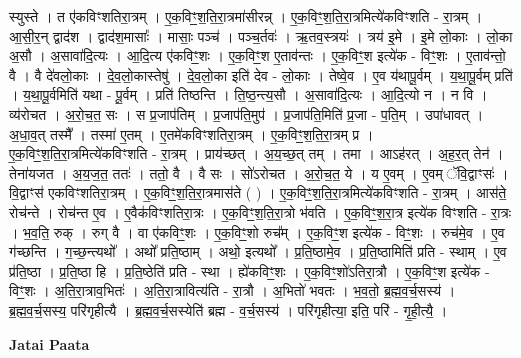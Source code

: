 \documentclass[17pt]{extarticle}
\begin{document}
स्युस्ते । त ए॑कविꣳशतिरा॒त्रम् । ए॒क॒विꣳ॒॒श॒ति॒रा॒त्रमा॑सीरन्न् । ए॒क॒विꣳ॒॒श॒ति॒रा॒त्रमित्ये॑कविꣳशति - रा॒त्रम् । आ॒सी॒र॒न् द्वाद॑श । द्वाद॑श॒मासाः᳚ । मासाः॒ पञ्च॑ । पञ्च॒र्तवः॑ । ऋ॒तव॒स्त्रयः॑ । त्रय॑ इ॒मे । इ॒मे लो॒काः । लो॒का अ॒सौ । अ॒सावा॑दि॒त्यः । आ॒दि॒त्य ए॑कविꣳ॒॒शः । ए॒क॒विꣳ॒॒श ए॒ताव॑न्तः । ए॒क॒विꣳ॒॒श इत्ये॑क - विꣳ॒॒शः । ए॒ताव॑न्तो॒ वै । वै दे॑वलो॒काः । दे॒व॒लो॒कास्तेषु॑ । दे॒व॒लो॒का इति॑ देव - लो॒काः । तेष्वे॒व । ए॒व य॑थापू॒र्वम् । य॒था॒पू॒र्वम् प्रति॑ । य॒था॒पू॒र्वमिति॑ यथा - पू॒र्वम् । प्रति॑ तिष्ठन्ति । ति॒ष्ठ॒न्त्य॒सौ । अ॒सावा॑दि॒त्यः । आ॒दि॒त्यो न । न वि । व्य॑रोचत । अ॒रो॒च॒त॒ सः । स प्र॒जाप॑तिम् । प्र॒जाप॑ति॒मुप॑ । प्र॒जाप॑ति॒मिति॑ प्र॒जा - प॒ति॒म् । उपा॑धावत् । अ॒धा॒व॒त् तस्मै᳚ । तस्मा॑ ए॒तम् । ए॒तमे॑कविꣳशतिरा॒त्रम् । ए॒क॒विꣳ॒॒श॒ति॒रा॒त्रम् प्र । ए॒क॒विꣳ॒॒श॒ति॒रा॒त्रमित्ये॑कविꣳशति - रा॒त्रम् । प्राय॑च्छत् । अ॒य॒च्छ॒त् तम् । तमा । आऽह॑रत् । अ॒ह॒र॒त् तेन॑ । तेना॑यजत । अ॒य॒ज॒त॒ ततः॑ । ततो॒ वै । वै सः । सो॑ऽरोचत । अ॒रो॒च॒त॒ ये । य ए॒वम् । ए॒वम् ॅवि॒द्वाꣳसः॑ । वि॒द्वाꣳस॑ एकविꣳशतिरा॒त्रम् । ए॒क॒विꣳ॒॒श॒ति॒रा॒त्रमास॑ते ( ) । ए॒क॒विꣳ॒॒श॒ति॒रा॒त्रमित्ये॑कविꣳशति - रा॒त्रम् । आस॑ते॒ रोच॑न्ते । रोच॑न्त ए॒व । ए॒वैक॑विꣳशतिरा॒त्रः । ए॒क॒विꣳ॒॒श॒ति॒रा॒त्रो भ॑वति । ए॒क॒विꣳ॒॒श॒रा॒त्र इत्ये॑क विꣳशति - रा॒त्रः । भ॒व॒ति॒ रुक् । रुग् वै । वा ए॑कविꣳ॒॒शः । ए॒क॒विꣳ॒॒शो रुच᳚म् । ए॒क॒विꣳ॒॒श इत्ये॑क - विꣳ॒॒शः । रुच॑मे॒व । ए॒व ग॑च्छन्ति । ग॒च्छ॒न्त्यथो᳚ । अथो᳚ प्रति॒ष्ठाम् । अथो॒ इत्यथो᳚ । प्र॒ति॒ष्ठामे॒व । प्र॒ति॒ष्ठामिति॑ प्रति - स्थाम् । ए॒व प्र॑ति॒ष्ठा । प्र॒ति॒ष्ठा हि । प्र॒ति॒ष्ठेति॑ प्रति - स्था । ह्ये॑कविꣳ॒॒शः । ए॒क॒विꣳ॒॒शो॑ऽतिरा॒त्रौ । ए॒क॒विꣳ॒॒श इत्ये॑क - विꣳ॒॒शः । अ॒ति॒रा॒त्राव॒भितः॑ । अ॒ति॒रा॒त्रावित्य॑ति - रा॒त्रौ । अ॒भितो॑ भवतः । भ॒व॒तो॒ ब्र॒ह्म॒व॒र्च॒सस्य॑ । ब्र॒ह्म॒व॒र्च॒सस्य॒ परि॑गृहीत्यै । ब्र॒ह्म॒व॒र्च॒सस्येति॑ ब्रह्म - व॒र्च॒सस्य॑ । परि॑गृहीत्या॒ इति॒ परि॑ - गृ॒ही॒त्यै॒ । \newline

\textbf{Jatai Paata} \newline
\end{document}
